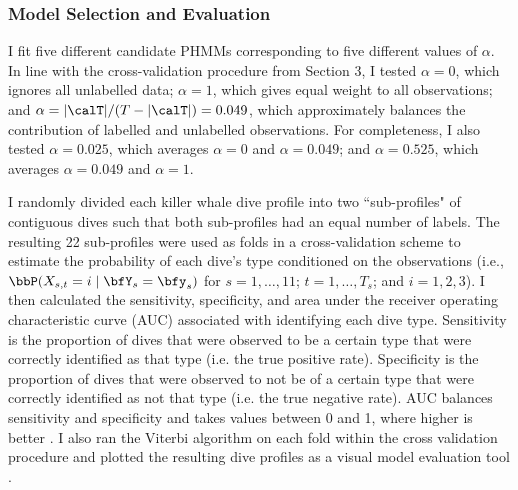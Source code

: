 \subsubsection{Model Selection and Evaluation}

I fit five different candidate PHMMs corresponding to five different values of $\alpha$. In line with the cross-validation procedure from Section 3, I tested $\alpha = 0$, which ignores all unlabelled data; $\alpha = 1$, which gives equal weight to all observations; and $\alpha = |\calT| / (T - |\calT|) = 0.049$, which approximately balances the contribution of labelled and unlabelled observations. For completeness, I also tested $\alpha = 0.025$, which averages $\alpha = 0$ and $\alpha = 0.049$; and $\alpha = 0.525$, which averages $\alpha = 0.049$ and $\alpha = 1$.

I randomly divided each killer whale dive profile into two ``sub-profiles" of contiguous dives such that both sub-profiles had an equal number of labels. The resulting 22 sub-profiles were used as folds in a cross-validation scheme to estimate the probability of each dive's type conditioned on the observations (i.e., $\bbP(X_{s,t} = i \mid \bfY_s = \bfy_s)$ for $s = 1,\ldots,11$; $t = 1,\ldots,T_s$; and $i = 1,2,3$). I then calculated the sensitivity, specificity, and area under the receiver operating characteristic curve (AUC) associated with identifying each dive type. Sensitivity is the proportion of dives that were observed to be a certain type that were correctly identified as that type (i.e. the true positive rate). Specificity is the proportion of dives that were observed to not be of a certain type that were correctly identified as not that type (i.e. the true negative rate). AUC balances sensitivity and specificity and takes values between 0 and 1, where higher is better \citep{Bradley:1997}. I also ran the Viterbi algorithm on each fold within the cross validation procedure and plotted the resulting dive profiles as a visual model evaluation tool \citep{Viterbi:1967}.


